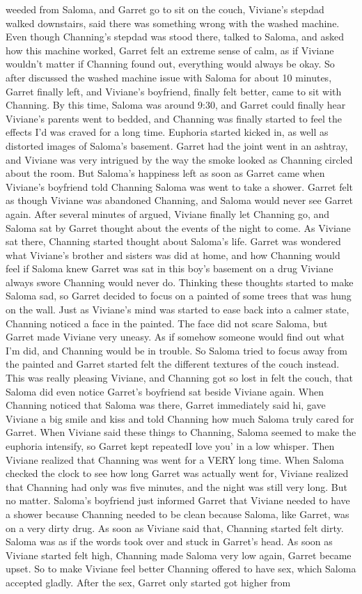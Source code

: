 \documentclass[12pt]{book}
\begin{document}
weeded from Saloma, and Garret go to sit on the couch, Viviane's stepdad walked downstairs, said there was something wrong with the washed machine. Even though Channing's stepdad was stood there, talked to Saloma, and asked how this machine worked, Garret felt an extreme sense of calm, as if Viviane wouldn't matter if Channing found out, everything would always be okay. So after discussed the washed machine issue with Saloma for about 10 minutes, Garret finally left, and Viviane's boyfriend, finally felt better, came to sit with Channing. By this time, Saloma was around 9:30, and Garret could finally hear Viviane's parents went to bedded, and Channing was finally started to feel the effects I'd was craved for a long time. Euphoria started kicked in, as well as distorted images of Saloma's basement. Garret had the joint went in an ashtray, and Viviane was very intrigued by the way the smoke looked as Channing circled about the room. But Saloma's happiness left as soon as Garret came when Viviane's boyfriend told Channing Saloma was went to take a shower. Garret felt as though Viviane was abandoned Channing, and Saloma would never see Garret again. After several minutes of argued, Viviane finally let Channing go, and Saloma sat by Garret thought about the events of the night to come. As Viviane sat there, Channing started thought about Saloma's life. Garret was wondered what Viviane's brother and sisters was did at home, and how Channing would feel if Saloma knew Garret was sat in this boy's basement on a drug Viviane always swore Channing would never do. Thinking these thoughts started to make Saloma sad, so Garret decided to focus on a painted of some trees that was hung on the wall. Just as Viviane's mind was started to ease back into a calmer state, Channing noticed a face in the painted. The face did not scare Saloma, but Garret made Viviane very uneasy. As if somehow someone would find out what I'm did, and Channing would be in trouble. So Saloma tried to focus away from the painted and Garret started felt the different textures of the couch instead. This was really pleasing Viviane, and Channing got so lost in felt the couch, that Saloma did even notice Garret's boyfriend sat beside Viviane again. When Channing noticed that Saloma was there, Garret immediately said hi, gave Viviane a big smile and kiss and told Channing how much Saloma truly cared for Garret. When Viviane said these things to Channing, Saloma seemed to make the euphoria intensify, so Garret kept repeatedI love you' in a low whisper. Then Viviane realized that Channing was went for a VERY long time. When Saloma checked the clock to see how long Garret was actually went for, Viviane realized that Channing had only was five minutes, and the night was still very long. But no matter. Saloma's boyfriend just informed Garret that Viviane needed to have a shower because Channing needed to be clean because Saloma, like Garret, was on a very dirty drug. As soon as Viviane said that, Channing started felt dirty. Saloma was as if the words took over and stuck in Garret's head. As soon as Viviane started felt high, Channing made Saloma very low again, Garret became upset. So to make Viviane feel better Channing offered to have sex, which Saloma accepted gladly. After the sex, Garret only started got higher from 
\end{document}
